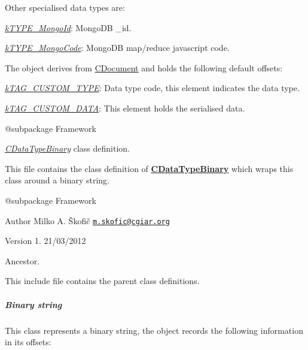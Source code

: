 Other specialised data types are\-:


\begin{DoxyItemize}
\item {\itshape \hyperlink{}{k\-T\-Y\-P\-E\-\_\-\-Mongo\-Id}}\-: Mongo\-D\-B \-\_\-id. 
\item {\itshape \hyperlink{}{k\-T\-Y\-P\-E\-\_\-\-Mongo\-Code}}\-: Mongo\-D\-B map/reduce javascript code. 
\end{DoxyItemize}

The object derives from \hyperlink{class_c_document}{C\-Document} and holds the following default offsets\-:


\begin{DoxyItemize}
\item {\itshape \hyperlink{}{k\-T\-A\-G\-\_\-\-C\-U\-S\-T\-O\-M\-\_\-\-T\-Y\-P\-E}}\-: Data type code, this element indicates the data type. 
\item {\itshape \hyperlink{}{k\-T\-A\-G\-\_\-\-C\-U\-S\-T\-O\-M\-\_\-\-D\-A\-T\-A}}\-: This element holds the serialised data. 
\end{DoxyItemize}

\begin{DoxyVerb} @subpackage        Framework\end{DoxyVerb}


{\itshape \hyperlink{class_c_data_type_binary}{C\-Data\-Type\-Binary}} class definition.

This file contains the class definition of {\bfseries \hyperlink{class_c_data_type_binary}{C\-Data\-Type\-Binary}} which wraps this class around a binary string.

\begin{DoxyVerb} @subpackage        Framework
\end{DoxyVerb}


\begin{DoxyAuthor}{Author}
Milko A. Škofič \href{mailto:m.skofic@cgiar.org}{\tt m.\-skofic@cgiar.\-org} 
\end{DoxyAuthor}
\begin{DoxyVersion}{Version}
1. 21/03/2012
\end{DoxyVersion}
Ancestor.

This include file contains the parent class definitions. \subparagraph*{Binary string}

This class represents a binary string, the object records the following information in its offsets\-:


